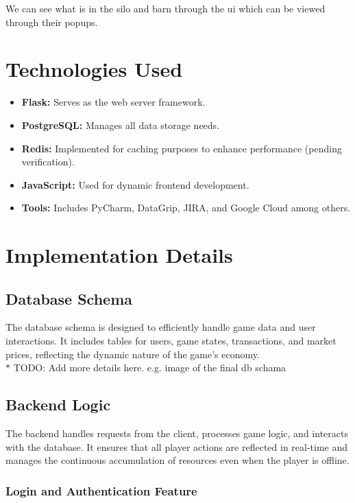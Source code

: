 \documentclass[12pt]{article}
\begin{document}
We can see what is in the silo and barn through the ui which can be viewed through their popups.


\section{Technologies Used}
\begin{itemize}
    \item \textbf{Flask:} Serves as the web server framework.
    \item \textbf{PostgreSQL:} Manages all data storage needs.
    \item \textbf{Redis:} Implemented for caching purposes to enhance performance (pending verification).
    \item \textbf{JavaScript:} Used for dynamic frontend development.
    \item \textbf{Tools:} Includes PyCharm, DataGrip, JIRA, and Google Cloud among others.
\end{itemize}

\section{Implementation Details}
\subsection{Database Schema}
The database schema is designed to efficiently handle game data and user interactions. It includes tables for users, game states, transactions, and market prices, reflecting the dynamic nature of the game's economy.
\\ $\ast$ TODO: Add more details here. e.g. image of the final db schama

\subsection{Backend Logic}
The backend handles requests from the client, processes game logic, and interacts with the database. It ensures that all player actions are reflected in real-time and manages the continuous accumulation of resources even when the player is offline.
\subsubsection{Login and Authentication Feature}
\end{document}
